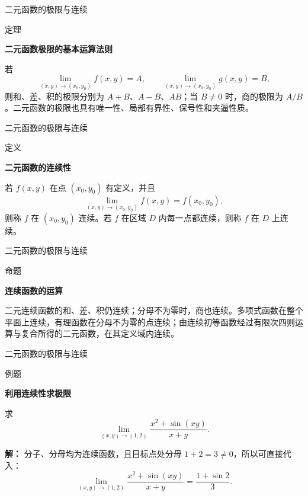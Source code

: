 \documentclass[aspectratio=169,10pt,fontset=fandol]{ctexbeamer}
\begin{document}
\begin{frame}[t,fragile]{二元函数的极限与连续}
\footnotesize
\begin{block}{定理}
{\footnotesize
\textbf{二元函数极限的基本运算法则}\par

	若
	\[
	\lim_{(x,y)\to(x_0,y_0)}f(x,y)=A,\qquad
	\lim_{(x,y)\to(x_0,y_0)}g(x,y)=B,
	\]
	则和、差、积的极限分别为 \(A+B\)、\(A-B\)、\(AB\)；当 \(B\neq0\) 时，商的极限为 \(A/B\)。二元函数的极限也具有唯一性、局部有界性、保号性和夹逼性质。

}
\end{block}
\end{frame}
\begin{frame}[t,fragile]{二元函数的极限与连续}
\footnotesize
\begin{block}{定义}
{\footnotesize
\textbf{二元函数的连续性}\par

	若 \(f(x,y)\) 在点 \((x_0,y_0)\) 有定义，并且
	\[
	\lim_{(x,y)\to(x_0,y_0)}f(x,y)=f(x_0,y_0),
	\]
	则称 \(f\) 在 \((x_0,y_0)\) 连续。若 \(f\) 在区域 \(D\) 内每一点都连续，则称 \(f\) 在 \(D\) 上连续。

}
\end{block}
\end{frame}
\begin{frame}[t,fragile]{二元函数的极限与连续}
\footnotesize
\begin{block}{命题}
{\footnotesize
\textbf{连续函数的运算}\par

	二元连续函数的和、差、积仍连续；分母不为零时，商也连续。多项式函数在整个平面上连续，有理函数在分母不为零的点连续；由连续初等函数经过有限次四则运算与复合所得的二元函数，在其定义域内连续。

}
\end{block}
\end{frame}
\begin{frame}[t,fragile]{二元函数的极限与连续}
\footnotesize
\begin{block}{例题}
{\footnotesize
\textbf{利用连续性求极限}\par

	求
	\[
	\lim_{(x,y)\to(1,2)}
	\frac{x^2+\sin(xy)}{x+y}.
	\]

}
\end{block}
\pause
{\footnotesize
\textbf{解：}
分子、分母均为连续函数，且目标点处分母 \(1+2=3\neq0\)，所以可直接代入：
	\[
	\lim_{(x,y)\to(1,2)}
	\frac{x^2+\sin(xy)}{x+y}
	=\frac{1+\sin2}{3}.
	\]

}
\end{frame}
\end{document}
